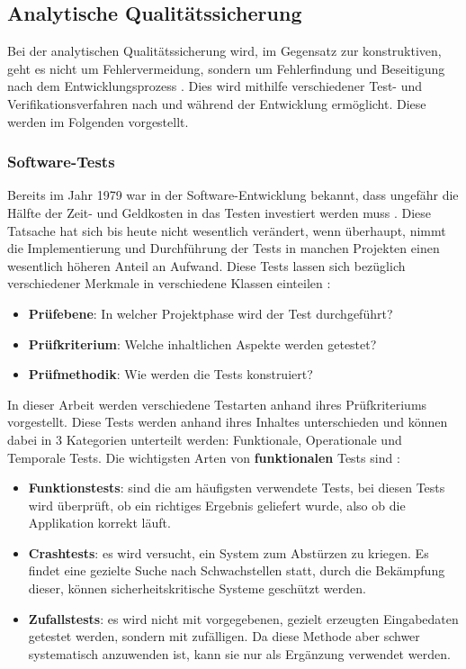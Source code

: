 \subsection{Analytische Qualitätssicherung}
\label{subsection:qualitaetsmanagement:analytische}
Bei der analytischen Qualitätssicherung wird, im Gegensatz zur konstruktiven, geht es nicht um Fehlervermeidung, sondern um Fehlerfindung und Beseitigung nach dem Entwicklungsprozess \cite[20]{Hoff:2008:Software:} \cite[132]{Goll:2011:Methoden:}. 
Dies wird mithilfe verschiedener Test- und Verifikationsverfahren nach und während der Entwicklung ermöglicht. Diese werden im Folgenden vorgestellt. 
\subsubsection{Software-Tests}
\label{subsubsec:qualitaetsmanagement:tests}
Bereits im Jahr 1979 war in der Software-Entwicklung bekannt, dass ungefähr die Hälfte der Zeit- und Geldkosten in das Testen investiert werden muss \cite{Myer:2012:art:}. 
Diese Tatsache hat sich bis heute nicht wesentlich verändert, wenn überhaupt, nimmt die Implementierung und Durchführung der Tests in manchen Projekten einen wesentlich höheren Anteil an Aufwand. 
Diese Tests lassen sich bezüglich verschiedener Merkmale in verschiedene Klassen einteilen \cite[158]{Hoff:2008:Software:}: 
\begin{itemize}
    \item \textbf{Prüfebene}: In welcher Projektphase wird der Test durchgeführt?
    \item \textbf{Prüfkriterium}: Welche inhaltlichen Aspekte werden getestet?
    \item \textbf{Prüfmethodik}: Wie werden die Tests konstruiert?
\end{itemize}
In dieser Arbeit werden verschiedene Testarten anhand ihres Prüfkriteriums vorgestellt. Diese Tests werden anhand ihres Inhaltes unterschieden und können dabei in 3 Kategorien unterteilt werden: Funktionale, Operationale und Temporale Tests.
Die wichtigsten Arten von \textbf{funktionalen} Tests sind \cite[170]{Hoff:2008:Software:} \cite[242]{Meye:2018:Softwareentwicklung:}:
\begin{itemize}
    \item \textbf{Funktionstests}: sind die am häufigsten verwendete Tests, bei diesen Tests wird überprüft, ob ein richtiges Ergebnis geliefert wurde, also ob die Applikation korrekt läuft.
    \item \textbf{Crashtests}: es wird versucht, ein System zum Abstürzen zu kriegen. Es findet eine gezielte Suche nach Schwachstellen statt, durch die Bekämpfung dieser, können sicherheitskritische Systeme geschützt werden.
    \item \textbf{Zufallstests}: es wird nicht mit vorgegebenen, gezielt erzeugten Eingabedaten getestet werden, sondern mit zufälligen. Da diese Methode aber schwer systematisch anzuwenden ist, kann sie nur als Ergänzung verwendet werden.    
\end{itemize}
